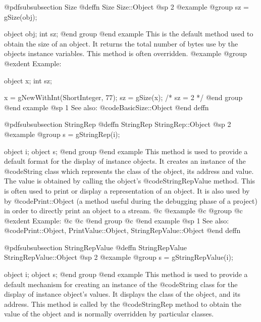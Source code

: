 @pdfsubsubsection {Size}
@deffn {Size} Size::Object
@sp 2
@example
@group
sz = gSize(obj);

object  obj;
int     sz;
@end group
@end example
This is the default method used to obtain the size of an object.
It returns the total number of bytes use by the objects instance variables.
This method is often overridden.
@example
@group
@exdent Example:

object  x;
int     sz;

x = gNewWithInt(ShortInteger, 77);
sz = gSize(x);    /*  sz = 2  */
@end group
@end example
@sp 1
See also:  @code{BasicSize::Object}
@end deffn












@pdfsubsubsection {StringRep}
@deffn {StringRep} StringRep::Object
@sp 2
@example
@group
s = gStringRep(i);

object  i;
object  s;
@end group
@end example
This method is used to provide a default format for the display of
instance objects.  It creates an instance of the @code{String} class
which represents the class of the object, its address and value.  The
value is obtained by calling the object's @code{StringRepValue} method.
This is often used to print or display a representation of an object.
It is also used by by @code{Print::Object} (a method useful during the
debugging phase of a project) in order to directly print an object to a
stream.
@c @example
@c @group
@c @exdent Example:
@c 
@c @end group
@c @end example
@sp 1
See also:  @code{Print::Object, PrintValue::Object, StringRepValue::Object}
@end deffn











@pdfsubsubsection {StringRepValue}
@deffn {StringRepValue} StringRepValue::Object
@sp 2
@example
@group
s = gStringRepValue(i);

object  i;
object  s;
@end group
@end example
This method is used to provide a default mechanism for creating an
instance of the @code{String} class for the display of instance object's
values.  It displays the class of the object, and its address.  This
method is called by the @code{StringRep} method to obtain the value of
the object and is normally overridden by particular classes.

